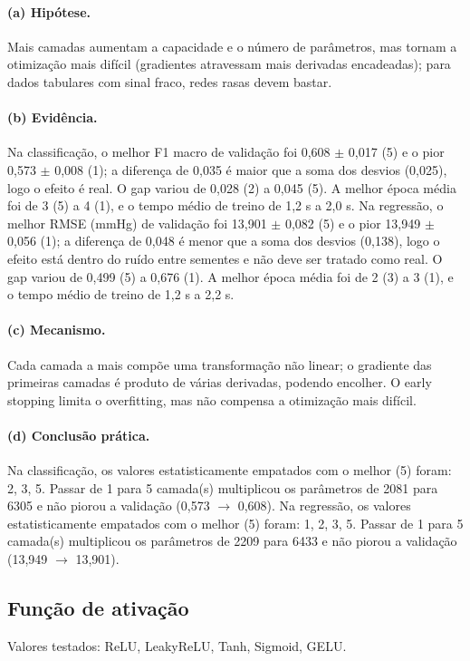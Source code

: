 \documentclass[11pt,a4paper]{article}
\begin{document}
\paragraph{(a) Hipótese.} Mais camadas aumentam a capacidade e o número de parâmetros, mas tornam a otimização mais difícil (gradientes atravessam mais derivadas encadeadas); para dados tabulares com sinal fraco, redes rasas devem bastar.

\paragraph{(b) Evidência.} Na classificação, o melhor F1 macro de validação foi 0,608 $\pm$ 0,017 (5) e o pior 0,573 $\pm$ 0,008 (1); a diferença de 0,035 é maior que a soma dos desvios (0,025), logo o efeito é real. O gap variou de 0,028 (2) a 0,045 (5). A melhor época média foi de 3 (5) a 4 (1), e o tempo médio de treino de 1,2 s a 2,0 s. Na regressão, o melhor RMSE (mmHg) de validação foi 13,901 $\pm$ 0,082 (5) e o pior 13,949 $\pm$ 0,056 (1); a diferença de 0,048 é menor que a soma dos desvios (0,138), logo o efeito está dentro do ruído entre sementes e não deve ser tratado como real. O gap variou de 0,499 (5) a 0,676 (1). A melhor época média foi de 2 (3) a 3 (1), e o tempo médio de treino de 1,2 s a 2,2 s.

\paragraph{(c) Mecanismo.} Cada camada a mais compõe uma transformação não linear; o gradiente das primeiras camadas é produto de várias derivadas, podendo encolher. O early stopping limita o overfitting, mas não compensa a otimização mais difícil.

\paragraph{(d) Conclusão prática.} Na classificação, os valores estatisticamente empatados com o melhor (5) foram: 2, 3, 5. Passar de 1 para 5 camada(s) multiplicou os parâmetros de 2081 para 6305 e não piorou a validação (0,573 $\to$ 0,608). Na regressão, os valores estatisticamente empatados com o melhor (5) foram: 1, 2, 3, 5. Passar de 1 para 5 camada(s) multiplicou os parâmetros de 2209 para 6433 e não piorou a validação (13,949 $\to$ 13,901).

\subsection{Função de ativação}
Valores testados: ReLU, LeakyReLU, Tanh, Sigmoid, GELU.
\end{document}
